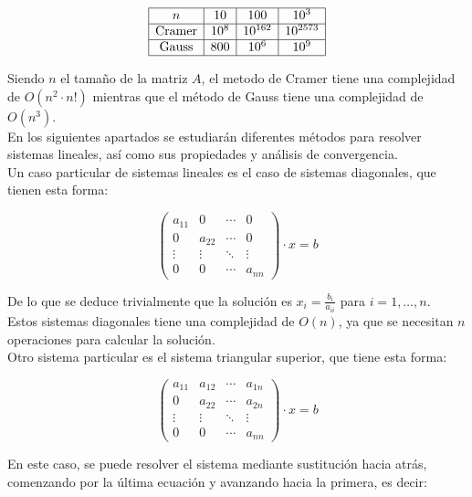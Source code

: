 \[
\begin{array}{|c|c|c|c|}
    \hline
    n & 10 & 100 & 10^3 \\
    \hline
    \text{Cramer} & 10^8 & 10^{162} & 10^{2573} \\
    \hline
    \text{Gauss} & 800 & 10^6 & 10^9 \\
    \hline
\end{array}
\]

Siendo $n$ el tamaño de la matriz $A$, el metodo de Cramer tiene una complejidad de $O(n^2 \cdot n!)$ mientras que el método de Gauss tiene una complejidad de $O(n^3)$.\\

En los siguientes apartados se estudiarán diferentes métodos para resolver sistemas lineales, así como sus propiedades y análisis de convergencia.\\

Un caso particular de sistemas lineales es el caso de sistemas diagonales, que tienen esta forma:

\[
    \begin{pmatrix}
        a_{11} & 0 & \cdots & 0 \\ 0 & a_{22} & \cdots & 0 \\ \vdots & \vdots & \ddots & \vdots \\ 0 & 0 & \cdots & a_{nn} 
    \end{pmatrix}
    \cdot x = b
\]

De lo que se deduce trivialmente que la solución es $x_i = \frac{b_i}{a_{ii}}$ para $i=1, \ldots, n$.\\

Estos sistemas diagonales tiene  una complejidad de $O(n)$, ya que se necesitan $n$ operaciones para calcular la solución.\\

Otro sistema particular es el sistema triangular superior, que tiene esta forma:

\[ 
\begin{pmatrix} 
    a_{11} & a_{12} & \cdots & a_{1n} \\ 0 & a_{22} & \cdots & a_{2n} \\ \vdots & \vdots & \ddots & \vdots \\ 0 & 0 & \cdots & a_{nn} 
\end{pmatrix} 
\cdot x = b 
\] 

En este caso, se puede resolver el sistema mediante sustitución hacia atrás, comenzando por la última ecuación y avanzando hacia la primera, es decir:

